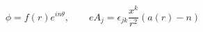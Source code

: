 \begin{equation}
\phi =f(r) e^{in\theta},\qquad eA_j=\epsilon_{jk} \frac {x^k}{r^2}
(a(r)-n) \label{vortex}
\end{equation}

